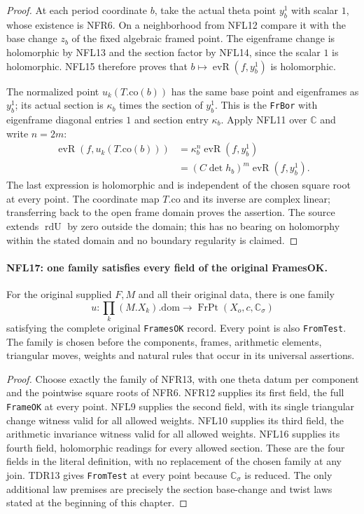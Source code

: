 \begin{proof}
At each period coordinate $b$, take the actual theta point
$y_b^1$ with scalar $1$, whose existence is NFR6.
On a neighborhood from NFL12 compare it with the base change
$z_b$ of the fixed algebraic framed point.
The eigenframe change is holomorphic by NFL13 and the section
factor by NFL14, since the scalar $1$ is holomorphic.
NFL15 therefore proves that
$b\mapsto\operatorname{evR}(f,y_b^1)$ is holomorphic.

The normalized point $u_k(T.\mathrm{co}(b))$ has the same
base point and eigenframes as $y_b^1$; its actual section is
$\kappa_b$ times the section of $y_b^1$.  This is the
\texttt{FrBor} with eigenframe diagonal entries $1$ and section
entry $\kappa_b$.  Apply NFL11 over $\mathbb C$ and write $n=2m$:
\[
 \begin{split}
 \operatorname{evR}(f,u_k(T.\mathrm{co}(b)))
   &=\kappa_b^n\operatorname{evR}(f,y_b^1)\\
   &=(C\det h_b)^m\operatorname{evR}(f,y_b^1).
 \end{split}
 \tag{NFL.24}
\]
The last expression is holomorphic and is independent of the
chosen square root at every point.  The coordinate map
$T.\mathrm{co}$ and its inverse are complex linear; transferring
back to the open frame domain proves the assertion.
The source extends $\operatorname{rdU}$ by zero outside the
domain; this has no bearing on holomorphy within the stated
domain and no boundary regularity is claimed.
\end{proof}

\paragraph{NFL17: one family satisfies every field of the original FramesOK.}
\label{claim:NFL17}
For the original supplied $F,M$ and all their original data,
there is one family
\[
 u:\prod_k(M.X_k).\mathrm{dom}\longrightarrow
       \operatorname{FrPt}(X_o,c,\mathbb C_\sigma)
\]
satisfying the complete original \texttt{FramesOK} record.
Every point is also \texttt{FromTest}.
The family is chosen before the components, frames, arithmetic
elements, triangular moves, weights and natural rules that occur
in its universal assertions.

\begin{proof}
Choose exactly the family of NFR13, with one theta datum per
component and the pointwise square roots of NFR6.
NFR12 supplies its first field, the full \texttt{FrameOK} at
every point.  NFL9 supplies the second field, with its single
triangular change witness valid for all allowed weights.
NFL10 supplies its third field, the arithmetic invariance
witness valid for all allowed weights.  NFL16 supplies its
fourth field, holomorphic readings for every allowed section.
These are the four fields in the literal definition, with no
replacement of the chosen family at any join.
TDR13 gives \texttt{FromTest} at every point because
$\mathbb C_\sigma$ is reduced.  The only additional law premises
are precisely the section base-change and twist laws stated
at the beginning of this chapter.
\end{proof}

